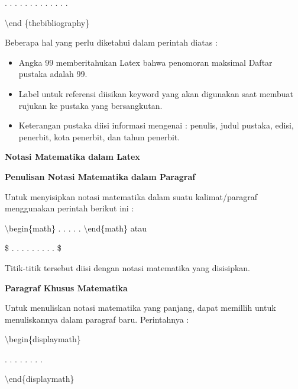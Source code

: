 . . . . . . . . . . . . .
\par \vspace{12pt}
$\setminus$end \{thebibliography\}
\par \vspace{12pt}


Beberapa hal yang perlu diketahui dalam perintah diatas :

\begin{itemize}
\item Angka 99 memberitahukan Latex bahwa penomoran maksimal Daftar pustaka adalah 99.
\item Label untuk referensi diisikan keyword yang akan digunakan saat membuat rujukan ke pustaka yang bersangkutan.
\item Keterangan pustaka diisi informasi mengenai : penulis, judul pustaka, edisi, penerbit, kota penerbit, dan tahun penerbit.
\end{itemize}


\textbf{Notasi Matematika dalam Latex}\par \vspace{12pt}

\textbf{Penulisan Notasi Matematika dalam Paragraf}\par \vspace{12pt}

Untuk menyisipkan notasi matematika dalam suatu kalimat/paragraf menggunakan perintah berikut ini :
\par \vspace{12pt}
$\setminus$begin\{math\} . . . . . $\setminus$end\{math\} atau
\par \vspace{12pt}
\$ . . . . . . . . . \$
\par \vspace{12pt}


Titik-titik tersebut diisi dengan notasi matematika yang disisipkan.\par \vspace{12pt}

\textbf{Paragraf Khusus Matematika}
\par \vspace{12pt}
Untuk menuliskan notasi matematika yang panjang, dapat memillih untuk menuliskannya dalam paragraf baru. Perintahnya :
\par \vspace{12pt}
$\setminus$begin\{displaymath\}
\par \vspace{12pt}
. . . . . . . .
\par \vspace{12pt}
$\setminus$end\{displaymath\}
\par \vspace{12pt}


